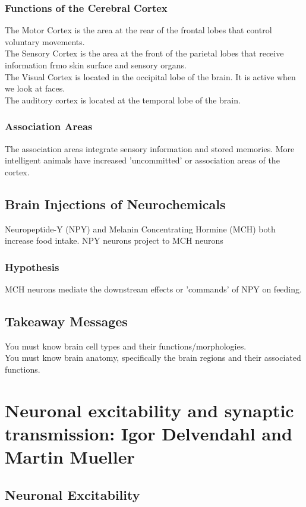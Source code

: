 \begin{itemize}
\subsubsection{Functions of the Cerebral Cortex}
The Motor Cortex is the area at the rear of the frontal lobes that control voluntary movements.
\\The Sensory Cortex is the area at the front of the parietal lobes that receive information frmo skin surface and sensory organs.
\\The Visual Cortex is located in the occipital lobe of the brain. It is active when we look at faces. 
\\The auditory cortex is located at the temporal lobe of the brain.

\subsubsection{Association Areas}
The association areas integrate sensory information and stored memories. More intelligent animals have increased 'uncommitted' or association areas of the cortex.

\subsection{Brain Injections of Neurochemicals}
Neuropeptide-Y (NPY) and Melanin Concentrating Hormine (MCH) both increase food intake.
NPY neurons project to MCH neurons
\subsubsection{Hypothesis}
MCH neurons mediate the downstream effects or 'commands' of NPY on feeding.

\subsection{Takeaway Messages}
You must know brain cell types and their functions/morphologies.
\\You must know brain anatomy, specifically the brain regions and their associated functions.
\section{Neuronal excitability and synaptic transmission: Igor Delvendahl and Martin Mueller}
\subsection{Neuronal Excitability}

\end{itemize}
